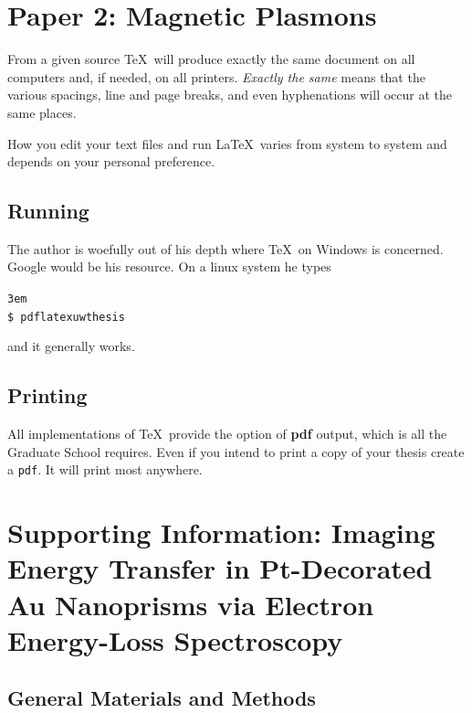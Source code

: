 \documentclass [11pt, proquest] {uwthesis}[2016/11/22]
\newenvironment{demo}
  {\begin{alltt}\leftskip3em
     \def\\{\ttfamily\char`\\}%
     \def\{{\ttfamily\char`\{}%
     \def\}{\ttfamily\char`\}}}
  {\end{alltt}}
\begin{document}
 
\chapter{Paper 2: Magnetic Plasmons}
 
 
From a given source \TeX\ will produce exactly the same document
on all computers and, if needed, on all printers.  {\it Exactly the same}
means that the various spacings, line and page breaks, and
even hyphenations will occur at the same places.

How you edit your text files and run \LaTeX\ varies
from system to system and depends on your personal preference.

\section{Running}

The author is woefully out of his depth where 
\TeX\ on Windows is concerned.  Google would be his resource.
On a linux system he types

\begin{demo}
\$\ pdflatex uwthesis
\end{demo}

and it generally works.

 
\section{Printing}
 
All implementations of \TeX\ provide the option of {\bf pdf} output,
which is all the Graduate School requires.  Even if you intend to
print a copy of your thesis create a 
{\tt pdf}.  It will print most anywhere.

\printendnotes

%
%
\nocite{*}   %


%
%
\appendix
\raggedbottom\sloppy
 
\chapter{Supporting Information: Imaging Energy Transfer in Pt-Decorated Au Nanoprisms via Electron Energy-Loss Spectroscopy}

\section{General Materials and Methods}
\end{document}
